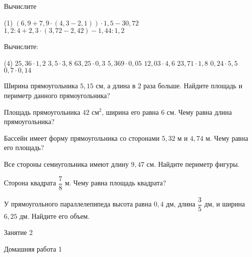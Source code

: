 %
%

\begin{class}[number=1]
	\begin{listofex}
		\item Вычислите \begin{tasks}(1)
			\task \( (6,9+7,9\cdot(4,3-2,1))\cdot1,5-30,72 \)
			\task \( 1,2:4+2,3\cdot(3,72-2,42)-1,44:1,2 \)
		\end{tasks}
		\item Вычислите:
		\begin{tasks}(4)
			\task \( 25,36\cdot1,2 \)
			\task \( 3,5\cdot3,8 \)
			\task \( 63,25\cdot0,3 \)
			\task \( 5,369\cdot0,05 \)
			\task \( 12,03\cdot4,6 \)
			\task \( 23,71\cdot1,8 \)
			\task \( 0,24\cdot5,5 \)
			\task \( 0,7\cdot0,14 \)
		\end{tasks}
		\item Ширина прямоугольника \( 5,15 \) см, а длина в \( 2 \) раза больше. Найдите площадь и периметр данного прямоугольника?
		\item Площадь прямоугольника \( 42 \) см\( ^{2} \), ширина его равна \( 6 \) см. Чему равна длина прямоугольника?
		\item Бассейн имеет форму прямоугольника со сторонами \( 5,32 \) м и \( 4,74 \) м. Чему равна его площадь?
		\item Все стороны семиугольника имеют длину \( 9,47 \) см. Найдите периметр фигуры.
		\item Сторона квадрата \( \dfrac{7}{8} \) м. Чему равна площадь квадрата?
		\item У прямоугольного параллелепипеда высота равна \( 0,4 \) дм, длина \( \dfrac{3}{5} \) дм, и ширина \( 6,25 \) дм. Найдите его объем.
	\end{listofex}
\end{class}

\begin{class}[number=2]
	\begin{listofex}
		\item Занятие 2
	\end{listofex}
\end{class}

\begin{homework}[number=1]
	\begin{listofex}
		\item Домашняя работа 1
	\end{listofex}
\end{homework}

